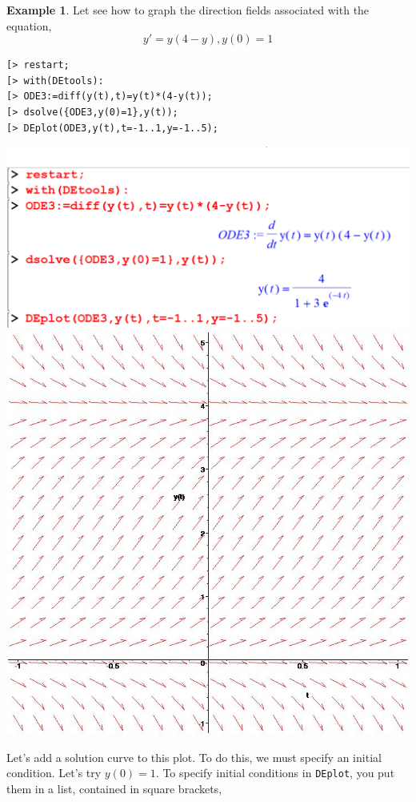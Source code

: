\documentclass[
]{book}
\theoremstyle{definition}
\theoremstyle{definition}
\newtheorem{example}{Example}[chapter]
\theoremstyle{definition}
\theoremstyle{definition}
\theoremstyle{remark}
\begin{document}
\begin{example}
\protect\hypertarget{exm:unnamed-chunk-52}{}\label{exm:unnamed-chunk-52}Let see how to graph the direction fields associated with the equation,
\[y' = y(4 − y), y(0) = 1\]
\end{example}

\begin{verbatim}
[> restart;
[> with(DEtools):
[> ODE3:=diff(y(t),t)=y(t)*(4-y(t));
[> dsolve({ODE3,y(0)=1},y(t));
[> DEplot(ODE3,y(t),t=-1..1,y=-1..5);
\end{verbatim}

\includegraphics{figures/Diff/Diff 6.5 -1.png}
\includegraphics{figures/Diff/Diff 6.5 -2.jpg}

Let's add a solution curve to this plot. To do this, we must specify an initial condition. Let's try \(y(0)=1\). To specify initial conditions in \texttt{DEplot}, you put them in a list, contained in square brackets,
\end{document}
